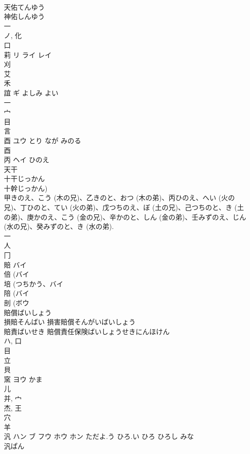 \documentclass[8pt]{extreport}
\begin{document}
\begin{CJK}{UTF8}{min}
\\	天佑てんゆう
\\	神佑しんゆう
\\	一 
\\	ノ, 化 
\\	口 
\\	莉	リ ライ レイ		
\\	刈 
\\	艾 
\\	禾 
\\	誼	ギ	よしみ よい	
\\	一 
\\	宀 
\\	目 
\\	言 
\\	酉	ユウ	とり なが みのる	
\\	酉 
\\	丙	ヘイ	ひのえ	
\\	天干 
\\	十干じっかん 
\\	十幹じっかん) 
\\	甲きのえ、こう (木の兄)、乙きのと、おつ (木の弟)、丙ひのえ、へい (火の兄)、丁ひのと、てい (火の弟)、戊つちのえ、ぼ (土の兄)、己つちのと、き (土の弟)、庚かのえ、こう (金の兄)、辛かのと、しん (金の弟)、壬みずのえ、じん (水の兄)、癸みずのと、き (水の弟). 
\\	一 
\\	人 
\\	冂 
\\	賠	バイ		
\\	倍 (バイ 
\\	培 (つちかう、バイ 
\\	陪 (バイ 
\\	剖 (ボウ 
\\	賠償ばいしょう 
\\	損賠そんばい 損害賠償そんがいばいしょう 
\\	賠責ばいせき 賠償責任保険ばいしょうせきにんほけん 
\\	ハ, 口 
\\	目 
\\	立 
\\	貝 
\\	窯	ヨウ	かま	
\\	儿 
\\	并, 宀 
\\	杰, 王 
\\	穴 
\\	羊 
\\	汎	ハン ブ フウ ホウ ホン	ただよ.う ひろ.い ひろ ひろし みな	
\\	汎ぱん 

\end{CJK}
\end{document}
